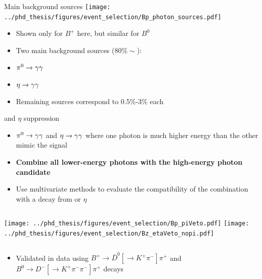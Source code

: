 \documentclass[xcolor=dvipsnames]{beamer}
\begin{document}
\begin{frame}{Main background sources}
\centering\scriptsize
      \texttt{[image: ../phd\_thesis/figures/event\_selection/Bp\_photon\_sources.pdf]}

      \begin{itemize}
         \item Shown only for $B^+$ here, but similar for $B^0$
         \item Two main background sources ($80\%\sim$):
         \item[\ra] $\pi^0\rightarrow\gamma\gamma$ 
         \item[\ra] $\eta\rightarrow\gamma\gamma$ 
         \item Remaining sources correspond to 0.5\%-3\% each 
      \end{itemize}

\end{frame}

\begin{frame}{\piz and $\eta$ suppression}
   \scriptsize\centering
\begin{itemize}
   \item $\pi^0\rightarrow\gamma\gamma$ and $\eta\rightarrow\gamma\gamma$ where one photon is much higher energy than the other mimic the signal
   \item \textbf{Combine all lower-energy photons with the high-energy photon candidate}
   \item Use multivariate methods to evaluate the compatibility of the combination with a decay from \piz or $\eta$
\end{itemize}
\begin{columns}
   \texttt{[image: ../phd\_thesis/figures/event\_selection/Bp\_piVeto.pdf]}
   \texttt{[image: ../phd\_thesis/figures/event\_selection/Bz\_etaVeto\_nopi.pdf]}
\end{columns}
\begin{itemize}
   \item[\ra] Validated in data using $B^+\to \bar{D}^0[\to K^+\pi^-]\pi^+$ and $B^0\to D^-[\to K^+\pi^-\pi^-]\pi^+$ decays
\end{itemize}
\end{frame}
\end{document}
